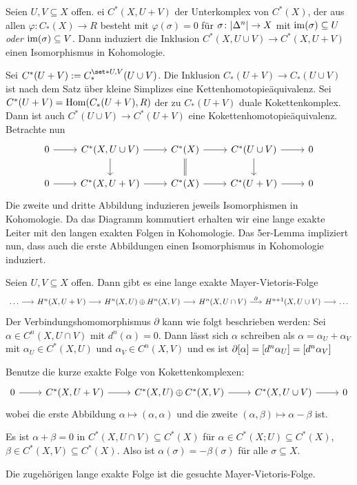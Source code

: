 \begin{lemma}
	Seien $U,V \subseteq X$ offen. ei $C^*(X,U+V)$ der Unterkomplex von $C^*(X)$, der aus allen $\varphi \colon C_*(X)\to R$ besteht mit $\varphi(\sigma)=0$ für $\sigma \colon \abs*{\Delta^n}\to X$ mit $\im (\sigma) \subseteq U$ \emph{oder} $\im (\sigma) \subseteq V$. 
	Dann induziert die Inklusion $C^*(X, U\cup V) \to C^*(X,U+V)$ einen Isomorphismus in Kohomologie.
\end{lemma}
\begin{beweis}
	Sei $C^*(U+V) := C_*^{\set*{U,V}}(U \cup V)$. 
	Die Inklusion $C_*(U +V)\to C_*(U \cup V)$ ist nach dem Satz über kleine Simplizes eine Kettenhomotopieäquivalenz.
	Sei $C^*(U+V)= \Hom \enbrace*{C_*(U+V),R}$ der zu $C_*(U+V)$ duale Kokettenkomplex. 
	Dann ist auch $C^*(U \cup V) \to C^*(U+V)$ eine Kokettenhomotopieäquivalenz.
	Betrachte nun
	\[
		\begin{tikzcd}
			0 \rar & C^*(X,U\cup V) \dar  \rar & C^*(X)\dar[equal] \rar & C^*(U \cup V) \dar \rar & 0 \\
			0 \rar & C^*(X,U+V) \rar & C^*(X) \rar & C^*(U+V) \rar & 0
		\end{tikzcd}
	\]
	Die zweite und dritte Abbildung induzieren jeweils Isomorphismen in Kohomologie. 
	Da das Diagramm kommutiert erhalten wir eine lange exakte Leiter mit den langen exakten Folgen in Kohomologie.
	Das 5er-Lemma impliziert nun, dass auch die erste Abbildungen einen Isomorphismus in Kohomologie induziert.
\end{beweis}

\begin{satz}
	Seien $U,V \subseteq X$ offen. Dann gibt es eine lange exakte Mayer-Vietoris-Folge 
	\[
		\begin{tikzcd}[sep=1.55em]
			\ldots \rar & H^n(X,U+V) \rar & H^n(X,U) \oplus H^n(X,V) \rar & H^n(X,U\cap V) \rar["\partial"] & H^{n+1}(X,U\cup V) \rar & \ldots 
		\end{tikzcd}
	\]
	Der Verbindungshomomorphismus $\partial$ kann wie folgt beschrieben werden: Sei $\alpha \in C^n(X,U \cap V)$ mit $d^n(\alpha)=0$.
	Dann lässt sich $\alpha$ schreiben als $\alpha= \alpha_U + \alpha_V$ mit $\alpha_U \in C^*(X,U)$ und $\alpha_V \in C^n(X,V)$ und es ist $\partial [\alpha] = \benbrace*{d^n \alpha_U}= \benbrace*{d^n \alpha_V}$
\end{satz}
\begin{beweis}
	Benutze die kurze exakte Folge von Kokettenkomplexen: 
	\[
		\begin{tikzcd}
			0 \rar & C^*(X,U + V) \rar & C^*(X,U) \oplus C^*(X,V) \rar & C^*(X, U \cup V) \rar & 0
		\end{tikzcd}
	\]
	wobei die erste Abbildung $\alpha \mapsto (\alpha,\alpha)$ und die zweite $(\alpha,\beta) \mapsto \alpha-\beta$ ist. 
	
	
	Es ist $\alpha+\beta=0$ in $C^*(X,U \cap V) \subseteq C^*(X)$ für $\alpha \in C^*(X;U) \subseteq C^*(X)$, $\beta \in C^*(X,V) \subseteq C^*(X)$. Also ist
	$\alpha(\sigma)= - \beta(\sigma)$ für alle $\sigma \subseteq X$.
	
	Die zugehörigen lange exakte Folge ist die gesuchte Mayer-Vietoris-Folge. 
\end{beweis}

